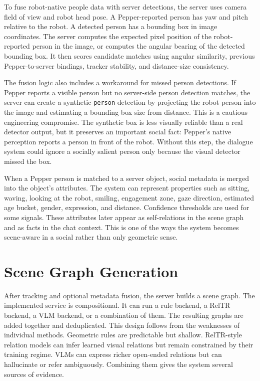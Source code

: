 To fuse robot-native people data with server detections, the server uses camera field of view and robot head pose. A Pepper-reported person has yaw and pitch relative to the robot. A detected person has a bounding box in image coordinates. The server computes the expected pixel position of the robot-reported person in the image, or computes the angular bearing of the detected bounding box. It then scores candidate matches using angular similarity, previous Pepper-to-server bindings, tracker stability, and distance-size consistency.

The fusion logic also includes a workaround for missed person detections. If Pepper reports a visible person but no server-side person detection matches, the server can create a synthetic \texttt{person} detection by projecting the robot person into the image and estimating a bounding box size from distance. This is a cautious engineering compromise. The synthetic box is less visually reliable than a real detector output, but it preserves an important social fact: Pepper's native perception reports a person in front of the robot. Without this step, the dialogue system could ignore a socially salient person only because the visual detector missed the box.

When a Pepper person is matched to a server object, social metadata is merged into the object's attributes. The system can represent properties such as sitting, waving, looking at the robot, smiling, engagement zone, gaze direction, estimated age bucket, gender, expression, and distance. Confidence thresholds are used for some signals. These attributes later appear as self-relations in the scene graph and as facts in the chat context. This is one of the ways the system becomes scene-aware in a social rather than only geometric sense.

\section{Scene Graph Generation}\label{sec:server-scene-graph-generation}

After tracking and optional metadata fusion, the server builds a scene graph. The implemented service is compositional. It can run a rule backend, a RelTR backend, a VLM backend, or a combination of them. The resulting graphs are added together and deduplicated. This design follows from the weaknesses of individual methods. Geometric rules are predictable but shallow. RelTR-style relation models can infer learned visual relations but remain constrained by their training regime. VLMs can express richer open-ended relations but can hallucinate or refer ambiguously. Combining them gives the system several sources of evidence.


